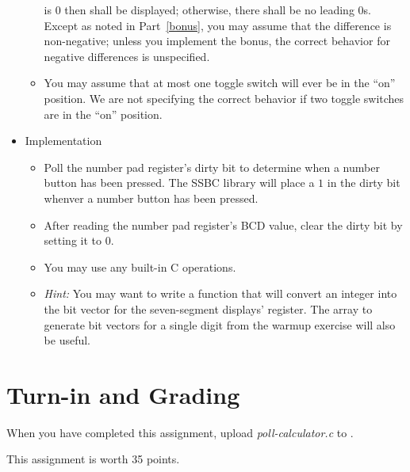 \begin{itemize}
\begin{itemize}
            is $0$ then {} shall be displayed; otherwise, there shall
            be no leading $0$s. Except as noted in Part~\ref{bonus}, you may
            assume that the difference is non-negative; unless you implement
            the bonus, the correct behavior for negative differences is
            unspecified.
        \item You may assume that at most one toggle switch will ever be in the
            ``on'' position. We are not specifying the correct behavior if two
            toggle switches are in the ``on'' position.
    \end{itemize}
    \item Implementation
    \begin{itemize}
        \item Poll the number pad register's dirty bit to determine when a
            number button has been pressed. The SSBC library will place a $1$
            in the dirty bit whenver a number button has been pressed.
        \item After reading the number pad register's BCD value, clear the dirty
            bit by setting it to $0$.
        \item You may use any built-in C operations.
        \item \textit{Hint: } You may want to write a function that will
            convert an integer into the bit vector for the seven-segment
            displays' register. The array to generate bit vectors for a single
            digit from the warmup exercise will also be useful.
    \end{itemize}
\end{itemize}

\section*{Turn-in and Grading}

When you have completed this assignment, upload \textit{poll-calculator.c} to
\filesubmission.

This assignment is worth 35 points. \\

